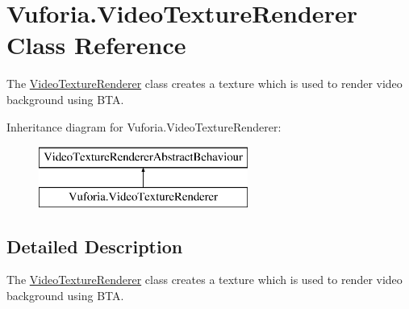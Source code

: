 \hypertarget{class_vuforia_1_1_video_texture_renderer}{}\section{Vuforia.\+Video\+Texture\+Renderer Class Reference}
\label{class_vuforia_1_1_video_texture_renderer}


The \hyperlink{class_vuforia_1_1_video_texture_renderer}{Video\+Texture\+Renderer} class creates a texture which is used to render video background using B\+T\+A.  


Inheritance diagram for Vuforia.\+Video\+Texture\+Renderer\+:\begin{figure}[H]
\begin{center}
\leavevmode
\includegraphics[height=2.000000cm]{class_vuforia_1_1_video_texture_renderer}
\end{center}
\end{figure}


\subsection{Detailed Description}
The \hyperlink{class_vuforia_1_1_video_texture_renderer}{Video\+Texture\+Renderer} class creates a texture which is used to render video background using B\+T\+A. 

